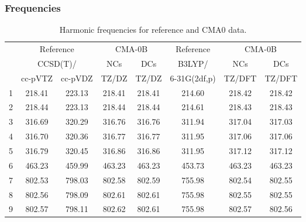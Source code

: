 \documentclass[10pt,oneside]{article}
\begin{document}
\clearpage

\subsubsection*{Frequencies}
\begin{table}[h!]
\centering
\caption{Harmonic frequencies for reference and CMA0 data.}
\begin{tabular}{cccccccc}
\toprule
{} & \multicolumn{2}{c}{Reference} & \multicolumn{2}{c}{CMA-0B} &    Reference & \multicolumn{2}{c}{CMA-0B} \\
{} & \multicolumn{2}{c}{CCSD(T)/} &    NCs &    DCs &       B3LYP/ &    NCs &    DCs \\
{} &   cc-pVTZ & cc-pVDZ &  TZ/DZ &  TZ/DZ & 6-31G(2df,p) & TZ/DFT & TZ/DFT \\
\midrule
1 &    218.41 &  223.13 & 218.41 & 218.41 &       214.60 & 218.42 & 218.42 \\
2 &    218.44 &  223.13 & 218.44 & 218.44 &       214.61 & 218.43 & 218.43 \\
3 &    316.69 &  320.29 & 316.76 & 316.76 &       311.94 & 317.04 & 317.03 \\
4 &    316.70 &  320.36 & 316.77 & 316.77 &       311.95 & 317.06 & 317.06 \\
5 &    316.79 &  320.45 & 316.86 & 316.86 &       311.95 & 317.12 & 317.12 \\
6 &    463.23 &  459.99 & 463.23 & 463.23 &       453.73 & 463.23 & 463.23 \\
7 &    802.53 &  798.03 & 802.58 & 802.59 &       755.98 & 802.54 & 802.55 \\
8 &    802.56 &  798.09 & 802.61 & 802.61 &       755.98 & 802.55 & 802.55 \\
9 &    802.57 &  798.11 & 802.62 & 802.61 &       755.98 & 802.57 & 802.56 \\
\bottomrule
\end{tabular}
\end{table}

\clearpage
\end{document}

